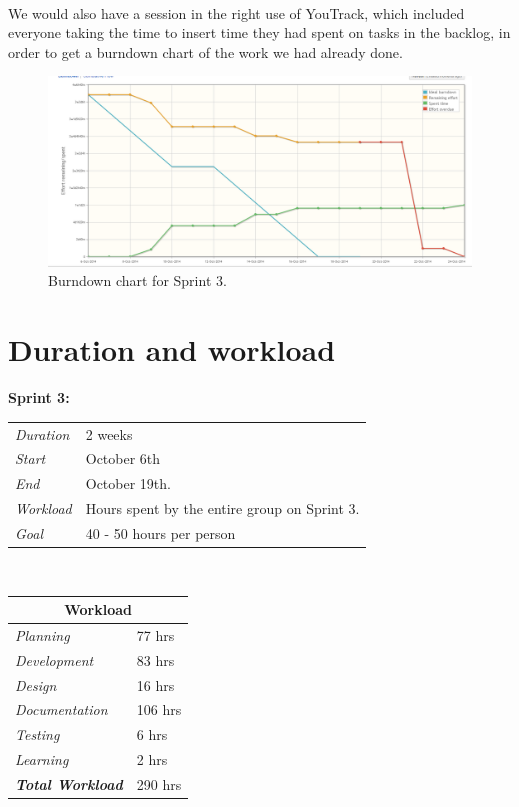 \paragraph{} We would also have a session in the right use of YouTrack, which included everyone taking the time to insert time they had spent on tasks in the backlog, in order to get a burndown chart of the work we had already done.

\begin{figure}[ht!]
  \centering
  \includegraphics[width=\linewidth]{./Sprint4/img/burndown}
  \caption{Burndown chart for Sprint 3.}
  \label{fig:S4PlanBurndown}
\end{figure}

\section{Duration and workload}
\label{sec:S4Duration}

\begin{minipage}{\linewidth}
\centering
\setlength{\tabcolsep}{22pt}
\textbf{Sprint 3:} 
\smallskip
{}
\begin{tabular}{ |l l| }
	\hline
	\it{Duration} & 2 weeks \\
	\it{Start} & October 6th \\
	\it{End} & October 19th. \\
	\it{Workload} & Hours spent by the entire group on Sprint 3. \\
	\it{Goal} & 40 - 50 hours per person \\
	\hline
\end{tabular}
\end{minipage}\\%
%
\begin{minipage}{\linewidth}
\setlength{\tabcolsep}{15pt}
\centering
{}
\begin{tabular}{ |l|l| }
	\hline
	\multicolumn{2}{|c|}{\cellcolor{gray!25} Workload} \\
	\hline
	\it{Planning} & 77 hrs\\
	\it{Development} & 83 hrs\\
	\it{Design} & 16 hrs\\
	\it{Documentation} & 106 hrs\\
	\it{Testing} & 6 hrs\\
	\it{Learning} & 2 hrs\\
	\hline
	\textbf{\textit{Total Workload}} & 290 hrs\\
	\hline
\end{tabular}
\end{minipage}

